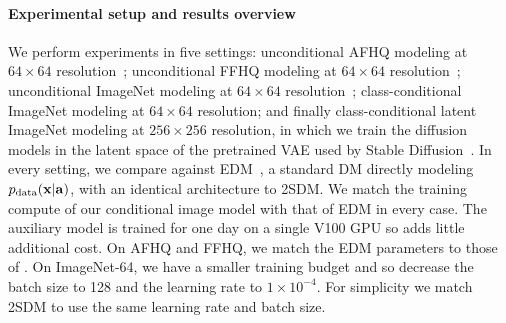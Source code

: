 \paragraph{Experimental setup and results overview}
We perform experiments in five settings: unconditional AFHQ modeling at $64\times64$ resolution~\citep{choi2020stargan}; unconditional FFHQ modeling at $64\times64$ resolution~\citep{karras2018style}; unconditional ImageNet modeling at $64\times64$ resolution~\citep{deng2009imagenet}; class-conditional ImageNet modeling at $64\times64$ resolution; and finally class-conditional latent ImageNet modeling at $256\times256$ resolution, in which we train the diffusion models in the latent space of the pretrained VAE used by Stable Diffusion~\citep{rombach2022high}. In every setting, we compare against EDM~\citep{karras2022elucidating}, a standard DM directly modeling $p_{\rm{data}}({\mathbf{x}}|{\mathbf{a}})$, with an identical architecture to 2SDM. We match the training compute of our conditional image model with that of EDM in every case. The auxiliary model is trained for one day on a single V100 GPU so adds little additional cost. On AFHQ and FFHQ, we match the EDM parameters to those of \citet{karras2022elucidating}. On ImageNet-64, we have a smaller training budget and so decrease the batch size to 128 and the learning rate to $1\times10^{-4}$. For simplicity we match 2SDM to use the same learning rate and batch size.

